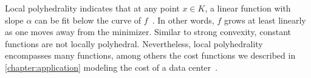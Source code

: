 Local polyhedrality indicates that at any point $x \in K$, a linear function with slope $\alpha$ can be fit below the curve of $f$~\cite{Goel2018}. In other words, $f$ grows at least linearly as one moves away from the minimizer. Similar to strong convexity, constant functions are not locally polyhedral. Nevertheless, local polyhedrality encompasses many functions, among others the cost functions we described in \cref{chapter:application} modeling the cost of a data center~\cite{Goel2018}.